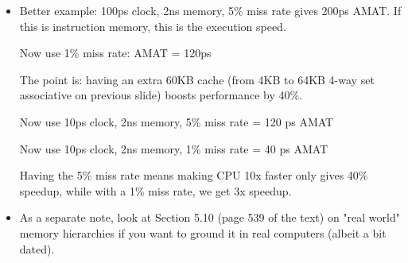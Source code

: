 \begin{frame}[fragile]
\begin{itemize}
	\item Better example: 100ps clock, 2ns memory, 5\% miss rate gives
		200ps AMAT.  If this is instruction memory, this is
		the execution speed.

		Now use 1\% miss rate: AMAT = 120ps

		The point is: having an extra 60KB cache (from 4KB to 64KB 
		4-way set associative on previous slide) boosts performance 
		by 40\%.

		\medskip
		Now use 10ps clock, 2ns memory, 5\% miss rate = 120 ps AMAT

		Now use 10ps clock, 2ns memory, 1\% miss rate = 40 ps AMAT


		Having the 5\% miss rate means making CPU 10x faster only gives 
		40\% speedup, while with a 1\% miss rate, we get 3x speedup.

	\item As a separate note, look at Section 5.10 (page 539 of the text)
		 on "real world" memory hierarchies if you want to ground it
		in real computers (albeit a bit dated).
\end{itemize}
\fi\ENotes
\end{frame}
\ifnum{}\fi


